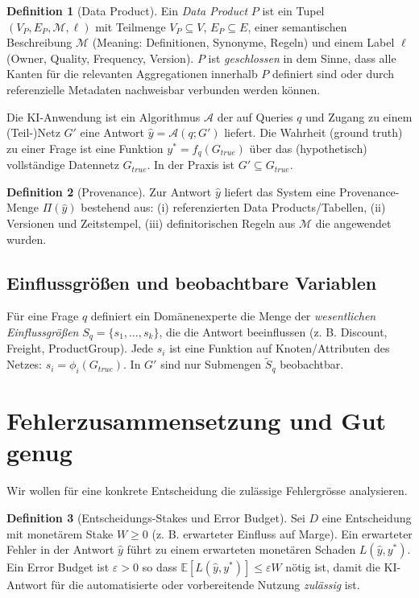 \documentclass[a4paper,12pt]{article}
\theoremstyle{definition}
\newtheorem{definition}{Definition}[section]
\newcommand{\E}{\mathbb{E}}
\begin{document}
\begin{definition}[Data Product]
Ein \emph{Data Product} $P$ ist ein Tupel $(V_P,E_P,\mathcal M,\ell)$ mit Teilmenge $V_P\subseteq V$, $E_P\subseteq E$, einer semantischen Beschreibung $\mathcal M$ (Meaning: Definitionen, Synonyme, Regeln) und einem Label $\ell$ (Owner, Quality, Frequency, Version). $P$ ist \emph{geschlossen} in dem Sinne, dass alle Kanten für die relevanten Aggregationen innerhalb $P$ definiert sind oder durch referenzielle Metadaten nachweisbar verbunden werden können.
\end{definition}

Die KI-Anwendung ist ein Algorithmus $\mathcal A$ der auf Queries $q$ und Zugang zu einem (Teil-)Netz $G'$ eine Antwort $\hat y=\mathcal A(q;G')$ liefert. Die Wahrheit (ground truth) zu einer Frage ist eine Funktion $y^*=f_q(G_{true})$ über das (hypothetisch) vollständige Datennetz $G_{true}$. In der Praxis ist $G'\subseteq G_{true}$.

\begin{definition}[Provenance]
Zur Antwort $\hat y$ liefert das System eine Provenance-Menge $\Pi(\hat y)$ bestehend aus: (i) referenzierten Data Products/Tabellen, (ii) Versionen und Zeitstempel, (iii) definitorischen Regeln aus $\mathcal M$ die angewendet wurden.
\end{definition}

\subsection{Einflussgrößen und beobachtbare Variablen}
Für eine Frage $q$ definiert ein Domänenexperte die Menge der \emph{wesentlichen Einflussgrößen} $S_q=\{s_1,\dots,s_k\}$, die die Antwort beeinflussen (z. B. Discount, Freight, ProductGroup). Jede $s_i$ ist eine Funktion auf Knoten/Attributen des Netzes: $s_i=\phi_i(G_{true})$. In $G'$ sind nur Submengen $\tilde S_q$ beobachtbar.

\section{Fehlerzusammensetzung und Gut genug}
\label{sec:error}
Wir wollen für eine konkrete Entscheidung die zulässige Fehlergrösse analysieren.

\begin{definition}[Entscheidungs-Stakes und Error Budget]
Sei $D$ eine Entscheidung mit monetärem Stake $W\ge0$ (z. B. erwarteter Einfluss auf Marge). Ein erwarteter Fehler in der Antwort $\hat y$ führt zu einem erwarteten monetären Schaden $L(\hat y,y^*)$. Ein Error Budget ist $\varepsilon>0$ so dass $\E[L(\hat y,y^*)]\le\varepsilon W$ nötig ist, damit die KI-Antwort für die automatisierte oder vorbereitende Nutzung \emph{zulässig} ist.
\end{definition}
\end{document}
